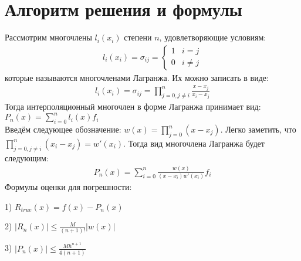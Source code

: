 \documentclass[10pt]{scrartcl}
\begin{document}
\section*{Алгоритм решения и формулы}\noindent
Рассмотрим многочлены $l_i(x_i)$ степени $n$, удовлетворяющие условиям:
\begin{gather*}
l_i(x_i) = \sigma_{ij} = 
\begin{cases}
   1 &\text{$i = j$}\\
   0 &\text{$i \neq j$}
 \end{cases}
\end{gather*}
которые называются многочленами Лагранжа. Их можно записать в виде:
\begin{gather*}
l_i(x_i) = \sigma_{ij} = \prod_{j=0, j\neq i}^{n}\frac{x - x_j}{x_i - x_j}
\end{gather*}
Тогда интерполяционный многочлен в форме Лагранжа принимает вид: $P_n(x) = \sum_{i = 0}^n l_i(x)f_i$\\
Введём следующее обозначение: $w(x) = \prod_{j=0}^n(x - x_j)$. Легко заметить, что $\prod_{j = 0, j \neq i}^n (x_i -
x_j) = w'(x_i)$. Тогда вид многочлена Лагранжа будет следующим:
\begin{gather*}
P_n(x) = \sum_{i = 0}^{n} \frac{w(x)}{(x - x_i)w'(x_i)}f_i
\end{gather*}
Формулы оценки для погрешности:

1) $R_{true}(x) = f(x) - P_n(x)$

2) $|R_n(x)| \leq \frac{M}{(n + 1)!}|w(x)|$

3) $|P_n(x)| \leq \frac{Mh^{n + 1}}{4(n + 1)}$
\end{document}
